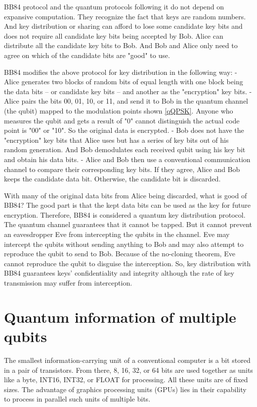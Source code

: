 \documentclass[oneside, letter, 12pt]{book}
\begin{document}
BB84 protocol and the quantum protocols following it do not depend on expansive computation. They recognize the fact that keys are random numbers. And key distribution or sharing can afford to lose some candidate key bits and does not require all candidate key bits being accepted by Bob. Alice can distribute all the candidate key bits to Bob. And Bob and Alice only need to agree on which of the candidate bits are "good" to use.

BB84 modifies the above protocol for key distribution in the following way:
- Alice generates two blocks of random bits of equal length with one block being the data bits -- or candidate key bits -- and another as the "encryption" key bits.
- Alice pairs the bits 00, 01, 10, or 11, and send it to Bob in the quantum channel (the qubit) mapped to the modulation points shown \ref{qQPSK}. Anyone who measures the qubit and gets a result of "0" cannot distinguish the actual code point is "00" or "10". So the original data is encrypted.
- Bob does not have the "encryption" key bits that Alice uses but has a series of key bits out of his random generation. And Bob demodulates each received qubit using his key bit and obtain his data bits.
- Alice and Bob then use a conventional communication channel to compare their corresponding key bits. If they agree, Alice and Bob keeps the candidate data bit. Otherwise, the candidate bit is discarded.

With many of the original data bits from Alice being discarded, what is good of BB84? The good part is that the kept data bits can be used as the key for future encryption. Therefore, BB84 is considered a quantum key distribution protocol. The quantum channel guarantees that it cannot be tapped. But it cannot prevent an eavesdropper Eve from intercepting the qubits in the channel. Eve may intercept the qubits without sending anything to Bob and may also attempt to reproduce the qubit to send to Bob. Because of the no-cloning theorem, Eve cannot reproduce the qubit to disguise the interception. So, key distribution with BB84 guarantees keys' confidentiality and integrity although the rate of key transmission may suffer from interception.

\chapter{Quantum information of multiple qubits}\label{c-n-qubit}
The smallest information-carrying unit of a conventional computer is a bit stored in a pair of transistors. From there, 8, 16, 32, or 64 bits are used together as units like a byte, INT16, INT32, or FLOAT for processing. All these units are of fixed sizes. The advantage of graphics processing units (GPUs) lies in their capability to process in parallel such units of multiple bits.
\end{document}
